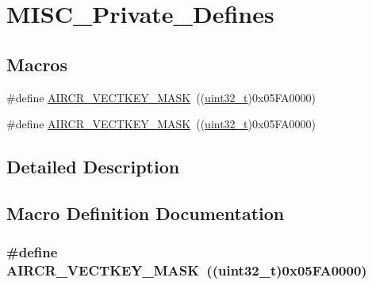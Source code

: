 \hypertarget{group___m_i_s_c___private___defines}{}\section{M\+I\+S\+C\+\_\+\+Private\+\_\+\+Defines}
\label{group___m_i_s_c___private___defines}
\subsection*{Macros}
\begin{DoxyCompactItemize}
\item 
\#define \hyperlink{group___m_i_s_c___private___defines_gad6905141fba3a2d8d5570db40805dc6a}{A\+I\+R\+C\+R\+\_\+\+V\+E\+C\+T\+K\+E\+Y\+\_\+\+M\+A\+SK}~((\hyperlink{_p_e___types_8h_a33594304e786b158f3fb30289278f5af}{uint32\+\_\+t})0x05\+F\+A0000)
\item 
\#define \hyperlink{group___m_i_s_c___private___defines_gad6905141fba3a2d8d5570db40805dc6a}{A\+I\+R\+C\+R\+\_\+\+V\+E\+C\+T\+K\+E\+Y\+\_\+\+M\+A\+SK}~((\hyperlink{_p_e___types_8h_a33594304e786b158f3fb30289278f5af}{uint32\+\_\+t})0x05\+F\+A0000)
\end{DoxyCompactItemize}


\subsection{Detailed Description}


\subsection{Macro Definition Documentation}
\subsubsection[{\texorpdfstring{A\+I\+R\+C\+R\+\_\+\+V\+E\+C\+T\+K\+E\+Y\+\_\+\+M\+A\+SK}{AIRCR_VECTKEY_MASK}}]{\setlength{\rightskip}{0pt plus 5cm}\#define A\+I\+R\+C\+R\+\_\+\+V\+E\+C\+T\+K\+E\+Y\+\_\+\+M\+A\+SK~(({\bf uint32\+\_\+t})0x05\+F\+A0000)}\hypertarget{group___m_i_s_c___private___defines_gad6905141fba3a2d8d5570db40805dc6a}{}\label{group___m_i_s_c___private___defines_gad6905141fba3a2d8d5570db40805dc6a}


